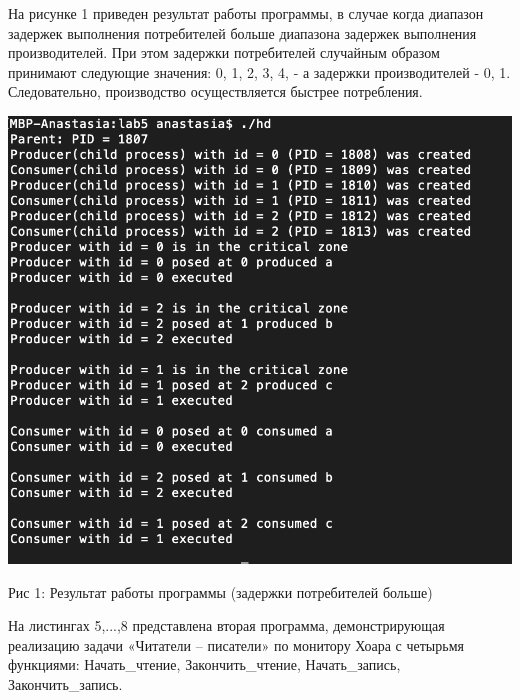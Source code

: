\documentclass[12pt]{report}
\begin{document}
На рисунке 1 приведен результат работы программы, в случае когда диапазон задержек выполнения потребителей больше диапазона задержек выполнения производителей. 
При этом задержки потребителей случайным образом принимают следующие значения: 0, 1, 2, 3, 4, - а задержки производителей - 0, 1. 
Следовательно, производство осуществляется быстрее потребления.
\begin{center}
		\includegraphics[scale=0.8]{pics/Cns_is_slower.png}
		
			Рис 1:  Результат работы программы (задержки потребителей больше)
\end{center}

На листингах 5,...,8 представлена вторая программа, демонстрирующая реализацию задачи «Читатели – писатели» по монитору Хоара с четырьмя функциями: Начать\_чтение, Закончить\_чтение, Начать\_запись, Закончить\_запись.
\end{document}
